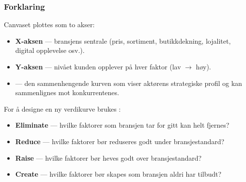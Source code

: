 \subsubsection*{Forklaring}
Canvaset plottes som to akser:
\begin{itemize}
  \item \textbf{X-aksen} --- bransjens sentrale
     (pris, sortiment, butikkdekning,
    lojalitet, digital opplevelse osv.).
  \item \textbf{Y-aksen} --- nivået kunden opplever på hver faktor
    (lav $\to$ høy).
  \item \textbf{} --- den sammenhengende kurven
    som viser aktørens strategiske profil og kan sammenlignes mot
    konkurrentenes.
\end{itemize}

For å designe en ny verdikurve brukes :
\begin{itemize}
  \item \textbf{Eliminate} --- hvilke faktorer som bransjen tar for
    gitt kan helt fjernes?
  \item \textbf{Reduce} --- hvilke faktorer bør reduseres godt under
    bransjestandard?
  \item \textbf{Raise} --- hvilke faktorer bør heves godt over
    bransjestandard?
  \item \textbf{Create} --- hvilke faktorer bør skapes som bransjen
    aldri har tilbudt?
\end{itemize}


